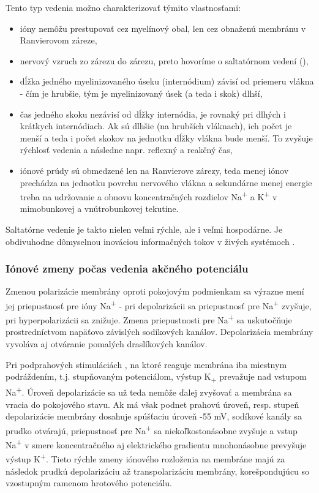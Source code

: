 Tento typ vedenia možno charakterizovať týmito vlastnosťami: 
\begin{itemize}
  \item ióny nemôžu prestupovať cez myelínový obal, len cez obnaženú membránu v Ranvierovom záreze,
  \item nervový vzruch  zo zárezu do zárezu, preto hovoríme o saltatórnom vedení (),
  \item dĺžka jedného myelinizovaného úseku (internódium) závisí od priemeru vlákna - čím je hrubšie, tým je myelinizovaný úsek (a teda i skok) dlhší,
  \item čas jedného skoku nezávisí od dĺžky internódia, je rovnaký pri dlhých i krátkych internódiach. Ak sú dlhšie (na hrubších vláknach), ich počet je menší a teda i počet skokov na jednotku dĺžky vlákna bude menší. To zvyšuje rýchlosť vedenia a následne napr. reflexný a reakčný čas,
  \item iónové prúdy sú obmedzené len na Ranvierove zárezy, teda menej iónov prechádza na jednotku povrchu nervového vlákna a sekundárne menej energie treba na udržovanie a obnovu koncentračných rozdielov Na\textsuperscript{+} a K\textsuperscript{+} v mimobunkovej a vnútrobunkovej tekutine.
\end{itemize}

Saltatórne vedenie je takto nielen veľmi rýchle, ale i veľmi hospodárne. Je obdivuhodne dômyselnou inováciou informačných tokov v živých systémoch \cite{bederFyziologiaCloveka2005}.

\subsubsection{Iónové zmeny počas vedenia akčného potenciálu}

Zmenou polarizácie membrány oproti pokojovým podmienkam sa výrazne mení jej priepustnosť pre ióny Na\textsuperscript{+} - pri depolarizácii sa priepustnosť pre Na\textsuperscript{+} zvyšuje, 
pri hyperpolarizácii sa znižuje. Zmena priepustnosti pre Na\textsuperscript{+} sa uskutočňuje prostredníctvom napäťovo závislých sodíkových kanálov. Depolarizácia membrány vyvoláva aj 
otváranie pomalých draslíkových kanálov. 

Pri podprahových stimuláciách , na ktoré reaguje membrána iba miestnym podráždením, t.j. stupňovaným potenciálom, výstup K\textsubscript{+} prevažuje nad vstupom Na\textsuperscript{+}. 
Úroveň depolarizácie sa už teda nemôže ďalej zvyšovať a membrána sa vracia do pokojového stavu. Ak má však podnet prahovú úroveň, resp. stupeň depolarizácie membrány dosahuje spúšťaciu úroveň
-55 mV, sodíkové kanály sa prudko otvárajú, priepustnosť pre Na\textsuperscript{+} sa niekoľkostonásobne zvyšuje a vstup Na\textsuperscript{+} v smere koncentračného aj elektrického gradientu
mnohonásobne prevyšuje výstup K\textsuperscript{+}. Tieto rýchle zmeny iónového rozloženia na membráne majú za následok prudkú depolarizáciu až transpolarizáciu membrány, korešpondujúcu so vzostupným
ramenom hrotového potenciálu.

